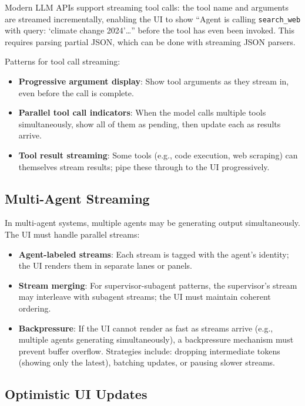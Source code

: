 Modern LLM APIs support streaming tool calls: the tool name and arguments are streamed incrementally, enabling the UI to show ``Agent is calling \texttt{search\_web} with query: ‘climate change 2024’\ldots{}'' before the tool has even been invoked. This requires parsing partial JSON, which can be done with streaming JSON parsers.

Patterns for tool call streaming:

\begin{itemize}
  \item \textbf{Progressive argument display}: Show tool arguments as they stream in, even before the call is complete.
  \item \textbf{Parallel tool call indicators}: When the model calls multiple tools simultaneously, show all of them as pending, then update each as results arrive.
  \item \textbf{Tool result streaming}: Some tools (e.g., code execution, web scraping) can themselves stream results; pipe these through to the UI progressively.
\end{itemize}

\subsection{Multi-Agent Streaming}
\label{multi-agent-streaming}

In multi-agent systems, multiple agents may be generating output simultaneously. The UI must handle parallel streams:

\begin{itemize}
  \item \textbf{Agent-labeled streams}: Each stream is tagged with the agent’s identity; the UI renders them in separate lanes or panels.
  \item \textbf{Stream merging}: For supervisor-subagent patterns, the supervisor’s stream may interleave with subagent streams; the UI must maintain coherent ordering.
  \item \textbf{Backpressure}: If the UI cannot render as fast as streams arrive (e.g., multiple agents generating simultaneously), a backpressure mechanism must prevent buffer overflow. Strategies include: dropping intermediate tokens (showing only the latest), batching updates, or pausing slower streams.
\end{itemize}

\subsection{Optimistic UI Updates}
\label{optimistic-ui-updates}

